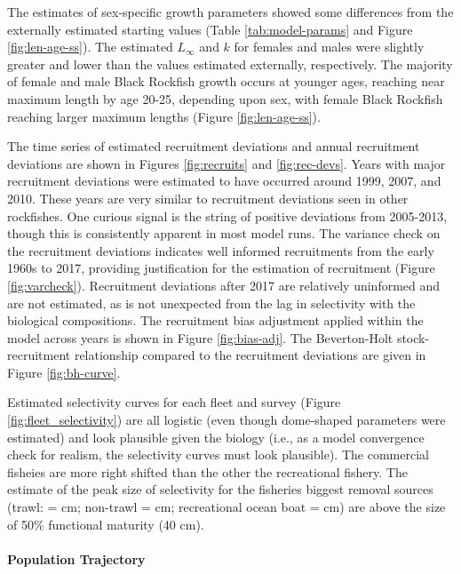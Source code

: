\documentclass[11pt,
  english,
  letterpaper,
]{article}
\begin{document}
The estimates of sex-specific growth parameters showed some differences from the externally estimated starting values (Table \ref{tab:model-params} and Figure \ref{fig:len-age-ss}). The estimated \(L_{\infty}\) and \(k\) for females and males were slightly greater and lower than the values estimated externally, respectively. The majority of female and male Black Rockfish growth occurs at younger ages, reaching near maximum length by age 20-25, depending upon sex, with female Black Rockfish reaching larger maximum lengths (Figure \ref{fig:len-age-ss}).

The time series of estimated recruitment deviations and annual recruitment deviations are shown in Figures \ref{fig:recruits} and \ref{fig:rec-devs}. Years with major recruitment deviations were estimated to have occurred around 1999, 2007, and 2010. These years are very similar to recruitment deviations seen in other rockfishes. One curious signal is the string of positive deviations from 2005-2013, though this is consistently apparent in most model runs. The variance check on the recruitment deviations indicates well informed recruitments from the early 1960s to 2017, providing justification for the estimation of recruitment (Figure \ref{fig:varcheck}). Recruitment deviations after 2017 are relatively uninformed and are not estimated, as is not unexpected from the lag in selectivity with the biological compositions. The recruitment bias adjustment applied within the model across years is shown in Figure \ref{fig:bias-adj}. The Beverton-Holt stock-recruitment relationship compared to the recruitment deviations are given in Figure \ref{fig:bh-curve}.

Estimated selectivity curves for each fleet and survey (Figure \ref{fig:fleet_selectivity}) are all logistic (even though dome-shaped parameters were estimated) and look plausible given the biology (i.e., as a model convergence check for realism, the selectivity curves must look plausible). The commercial fisheies are more right shifted than the other the recreational fishery. The estimate of the peak size of selectivity for the fisheries biggest removal sources (trawl: = cm; non-trawl = cm; recreational ocean boat = cm) are above the size of 50\% functional maturity (40 cm).

\hypertarget{population-trajectory}{%
\paragraph{Population Trajectory}\label{population-trajectory}}
\end{document}
